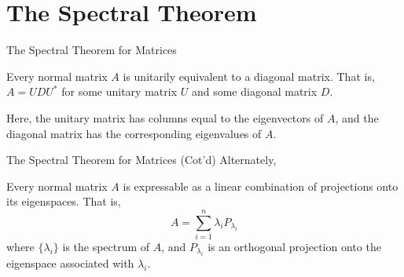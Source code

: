 \documentclass{beamer}
\begin{document}
\section{The Spectral Theorem}
\begin{frame}{The Spectral Theorem for Matrices}
    \begin{theorem}
        Every normal matrix $A$ is unitarily equivalent to a diagonal matrix.
        That is, $A = UDU^*$ for some unitary matrix $U$ and some diagonal
        matrix $D$.
    \end{theorem}
    Here, the unitary matrix has columns equal to the eigenvectors of $A$, and
    the diagonal matrix has the corresponding eigenvalues of $A$.

\end{frame}
\begin{frame}{The Spectral Theorem for Matrices (Cot'd)}
    Alternately,
    \begin{theorem}
        Every normal matrix $A$ is expressable as a linear combination of
        projections onto its eigenspaces. That is,
        \[
            A = \sum_{i=1}^n \lambda_i P_{\lambda_i}
        \]
        where $\{\lambda_i\}$ is the spectrum of $A$, and $P_{\lambda_i}$ is an
        orthogonal projection onto the eigenspace associated with $\lambda_i$.
    \end{theorem}

\end{frame}
\end{document}
